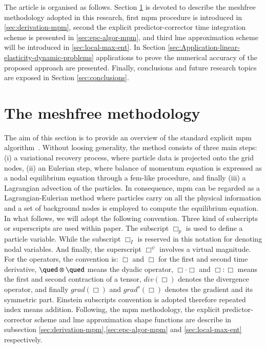 \documentclass[preprint,12pt,a4paper]{elsarticle}
\newcommand{\Div}[1]{
  \ensuremath{div({#1})}
}
\newcommand\Grad[1]{grad({#1})}
\newcommand\GradS[1]{grad^s({#1})}
\begin{document}
The article is organised as follows. Section \ref{sec:meshfree-methodology}
is devoted to describe the meshfree methodology adopted in this
research, first \acrshort{mpm} procedure is introduced in
\ref{sec:derivation-mpm}, second the explicit predictor-corrector
time integration scheme is presented in \ref{sec:epc-algor-mpm}, and
third \acrshort{lme} approximation scheme will be introduced in
\ref{sec:local-max-ent}. In Section
\ref{sec:Application-linear-elasticity-dynamic-problems} applications
to prove the numerical accuracy of the proposed approach are
presented. Finally, conclusions and future research topics are exposed in Section \ref{sec:conclusions}.


\section{The meshfree methodology}
\label{sec:meshfree-methodology}

The aim of this section is to provide an overview of the standard
explicit \acrshort{mpm} algorithm~\cite{Sulsky1994}. Without loosing
generality, the method consists of three main steps: (i) a
variational recovery process, where particle data is projected onto the
grid nodes, (ii) an Eulerian step, where balance of momentum equation
is expressed as a nodal equilibrium equation through a \acrshort{fem}-like
procedure, and finally (iii) a Lagrangian advection of the
particles. In consequence, \acrshort{mpm} can be regarded as a
Lagrangian-Eulerian method where particles carry on all the physical
information and a set of background nodes is employed to
compute the equilibrium equation. In what follows, we will adopt the
following convention. Three kind of subscripts or superscripts are used
within paper. The subscript $\Box_p$ is used to define a particle
variable. While the subscript $\Box_I$ is reserved in this notation for denoting nodal
variables. And finally, the superscript $\Box^{\psi}$ involves a
virtual magnitude. For the operators, the convention is: $\dot{\Box}$ and
$\ddot{\Box}$ for the first and second time derivative, $\qued \otimes
\qued$ means the dyadic operator, $\Box \cdot \Box$ and $\Box \colon \Box$ means the
first and second contraction of a tensor, $\Div{\Box}$ denotes the
divergence operator, and finally $\Grad{\Box}$ and $\GradS{\Box}$
denotes the gradient and its symmetric part. Einstein subscripts
convention is adopted therefore repeated index means addition. Following, the \acrshort{mpm} methodology, the explicit predictor-corrector scheme and \acrshort{lme} approximation shape functions are describe in subsection \ref{sec:derivation-mpm},\ref{sec:epc-algor-mpm} and \ref{sec:local-max-ent} respectively.
\end{document}
